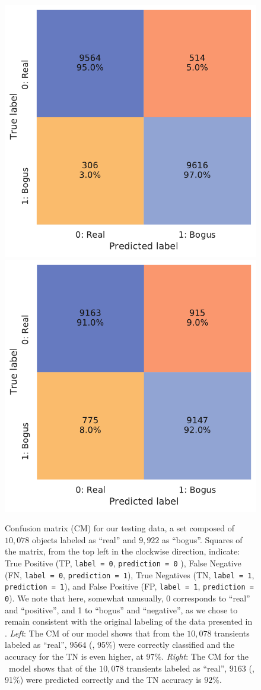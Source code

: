 \begin{figure}
    \centering
    \includegraphics[width=0.45\linewidth]{
    figures/confusionmatrix_model_more_dataAAAD_3s3DH_newcolors.pdf}
    \includegraphics[width=0.45\linewidth]{
    figures/confusionmatrix_model_more_dataCCC_3s2DH_newcolors.pdf}
    \caption{Confusion matrix (CM) for our testing data, a set composed of $10,078$ objects labeled as ``real'' and $9,922$ as ``bogus''.  Squares of the matrix, from the top left in the clockwise direction, indicate: True Positive (TP, \texttt{label = 0}, \texttt{prediction = 0} ), False Negative (FN, \texttt{label = 0}, \texttt{prediction = 1}), True Negatives (TN, \texttt{label = 1}, \texttt{prediction = 1}), and False Positive (FP, \texttt{label = 1}, \texttt{prediction = 0}). We note that here, somewhat unusually, 0 corresponds to ``real'' and ``positive'', and 1 to ``bogus'' and ``negative'', as we chose to remain consistent with the original labeling of the data presented in \citep{Goldstein_2015}. 
    {\it Left}: The CM of our \textbf{\diabased } model shows that from the $10,078$ transients labeled as ``real'', $9564$ (\ie, 95\%) were correctly classified and the accuracy for the TN is even higher, at $97\%$. {\it Right}: The CM for the \nodia\ model shows that of the $10,078$ transients labeled as ``real'', $9163$ (\ie, 91\%) were predicted correctly and the TN accuracy is $92\%$. }
    \label{fig:confusiomatrix_models}
\end{figure}



